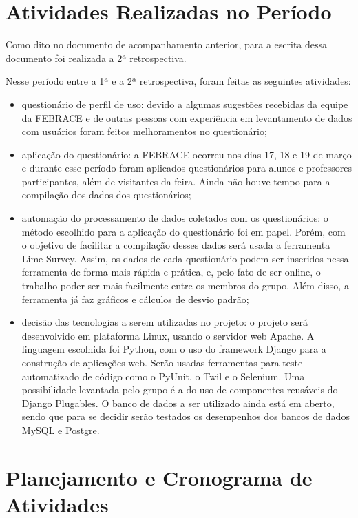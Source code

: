 \documentclass[a4paper,12pt,font=plain,header=plain]{abnt}
\begin{document}
  	\section{Atividades Realizadas no Período}
		
		Como dito no documento de acompanhamento anterior, para a escrita dessa documento foi realizada a 2ª retrospectiva.

		Nesse período entre a 1ª e a 2ª retrospectiva, foram feitas as seguintes atividades:
		\begin{itemize}
		 \item questionário de perfil de uso: devido a algumas sugestões recebidas da equipe da FEBRACE e de outras pessoas com experiência em levantamento de dados com usuários foram feitos melhoramentos no questionário;
		 \item aplicação do questionário: a FEBRACE ocorreu nos dias 17, 18 e 19 de março e durante esse período foram aplicados questionários para alunos e professores participantes, além de visitantes da feira. Ainda não houve tempo para a compilação dos dados dos questionários;
		 \item automação do processamento de dados coletados com os questionários: o método escolhido para a aplicação do questionário foi em papel. Porém, com o objetivo de facilitar a compilação desses dados será usada a ferramenta Lime Survey. Assim, os dados de cada questionário podem ser inseridos nessa ferramenta de forma mais rápida e prática, e, pelo fato de ser online, o trabalho poder ser mais facilmente entre os membros do grupo. Além disso, a ferramenta já faz gráficos e cálculos de desvio padrão;
		 \item decisão das tecnologias a serem utilizadas no projeto: o projeto será desenvolvido em plataforma Linux, usando o servidor web Apache. A linguagem escolhida foi Python, com o uso do framework Django para a construção de aplicações web. Serão usadas ferramentas para teste automatizado de código como o PyUnit, o Twil e o Selenium. Uma possibilidade levantada pelo grupo é a do uso de componentes reusáveis do Django Plugables. O banco de dados a ser utilizado ainda está em aberto, sendo que para se decidir serão testados os desempenhos dos bancos de dados MySQL e Postgre.
		\end{itemize}
	
  	\section{Planejamento e Cronograma de Atividades}
\end{document}
